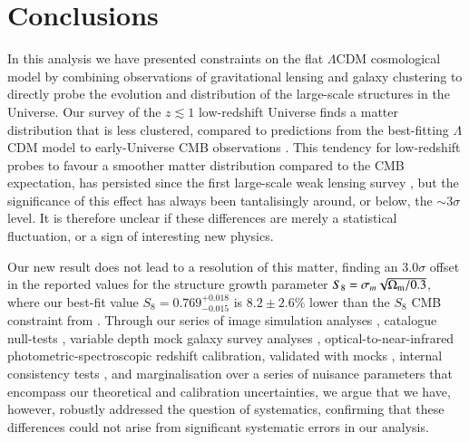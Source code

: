\section{Conclusions}
\label{sec:conc}
In this analysis we have presented constraints on the flat $\Lambda$CDM cosmological model by combining observations of gravitational lensing and galaxy clustering to directly probe the evolution and distribution of the large-scale structures in the Universe.    Our survey of the $z \lesssim 1$ low-redshift Universe finds a matter distribution that is less clustered, compared to predictions from the best-fitting $\Lambda$CDM model to early-Universe CMB observations \citep{planck/etal:2018}.  This tendency for low-redshift probes to favour a smoother matter distribution compared to the CMB expectation, has persisted since the first large-scale weak lensing survey \citep[CFHTLenS,][]{heymans/etal:2013}, but the significance of this effect has always been tantalisingly around, or below, the $\sim 3\sigma$ level.   It is therefore unclear if these differences are merely a statistical fluctuation, or a sign of interesting new physics.    

Our new result does not lead to a resolution of this matter, finding an $3.0\sigma$ offset in the reported values for the structure growth parameter $S_8 = \sigma_m \sqrt{\Omega_{\rm m}/0.3}$, where our best-fit value $S_8=0.769^{+0.018}_{-0.015}$ is $8.2 \pm 2.6\%$ lower than the $S_8$ CMB constraint from \citet{planck/etal:2018}.   Through our series of image simulation analyses \citep{kannawadi/etal:2019}, catalogue null-tests \citep{giblin/etal:inprep}, variable depth mock galaxy survey analyses \citep{joachimi/etal:inprep}, optical-to-near-infrared photometric-spectroscopic redshift calibration, validated with mocks \citep{wright/etal:2020, vandenbusch/etal:2020,hildebrandt/etal:inprep}, internal consistency tests \citep{asgari/etal:inprep}, and marginalisation over a series of nuisance parameters that encompass our theoretical and calibration uncertainties,  we argue that we have, however, robustly addressed the question of systematics, confirming that these differences could not arise from significant systematic errors in our analysis.

